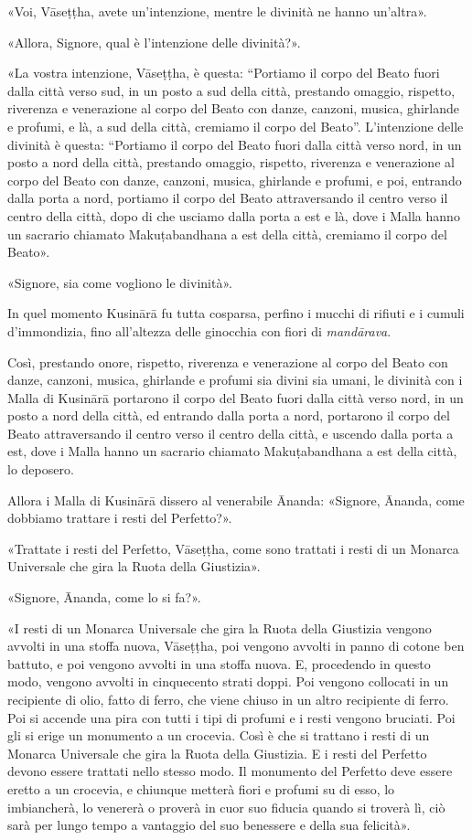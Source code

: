«Voi, Vāseṭṭha, avete un’intenzione, mentre le divinità ne hanno
un’altra».


«Allora, Signore, qual è l’intenzione delle divinità?».


«La vostra intenzione, Vāseṭṭha, è questa: “Portiamo il corpo del Beato
fuori dalla città verso sud, in un posto a sud della città, prestando
omaggio, rispetto, riverenza e venerazione al corpo del Beato con danze,
canzoni, musica, ghirlande e profumi, e là, a sud della città, cremiamo
il corpo del Beato”. L’intenzione delle divinità è questa: “Portiamo il
corpo del Beato fuori dalla città verso nord, in un posto a nord della
città, prestando omaggio, rispetto, riverenza e venerazione al corpo del
Beato con danze, canzoni, musica, ghirlande e profumi, e poi, entrando
dalla porta a nord, portiamo il corpo del Beato attraversando il centro
verso il centro della città, dopo di che usciamo dalla porta a est e là,
dove i Malla hanno un sacrario chiamato Makuṭabandhana a est della
città, cremiamo il corpo del Beato».


«Signore, sia come vogliono le divinità».


In quel momento Kusinārā fu tutta cosparsa, perfino i mucchi di rifiuti
e i cumuli d’immondizia, fino all’altezza delle ginocchia con fiori di
\emph{mandārava}.


Così, prestando onore, rispetto, riverenza e venerazione al corpo del
Beato con danze, canzoni, musica, ghirlande e profumi sia divini sia
umani, le divinità con i Malla di Kusinārā portarono il corpo del Beato
fuori dalla città verso nord, in un posto a nord della città, ed
entrando dalla porta a nord, portarono il corpo del Beato attraversando
il centro verso il centro della città, e uscendo dalla porta a est, dove
i Malla hanno un sacrario chiamato Makuṭabandhana a est della città, lo
deposero.


Allora i Malla di Kusinārā dissero al venerabile Ānanda: «Signore,
Ānanda, come dobbiamo trattare i resti del Perfetto?».


«Trattate i resti del Perfetto, Vāseṭṭha, come sono trattati i resti di
un Monarca Universale che gira la Ruota della Giustizia».


«Signore, Ānanda, come lo si fa?».


«I resti di un Monarca Universale che gira la Ruota della Giustizia
vengono avvolti in una stoffa nuova, Vāseṭṭha, poi vengono avvolti in
panno di cotone ben battuto, e poi vengono avvolti in una stoffa nuova.
E, procedendo in questo modo, vengono avvolti in cinquecento strati doppi.
Poi vengono collocati in un recipiente di olio, fatto di ferro, che
viene chiuso in un altro recipiente di ferro. Poi si accende una pira
con tutti i tipi di profumi e i resti vengono bruciati. Poi gli si erige
un monumento a un crocevia. Così è che si trattano i resti di un Monarca
Universale che gira la Ruota della Giustizia. E i resti del Perfetto
devono essere trattati nello stesso modo. Il monumento del Perfetto deve
essere eretto a un crocevia, e chiunque metterà fiori e profumi su di
esso, lo imbiancherà, lo venererà o proverà in cuor suo fiducia quando
si troverà lì, ciò sarà per lungo tempo a vantaggio del suo benessere e
della sua felicità».


